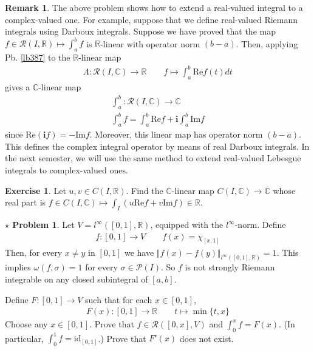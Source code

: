 \documentclass[12pt,b5paper,notitlepage]{article}
\theoremstyle{definition}
\newtheorem{exe}[df]{Exercise}
\newtheorem{rem}[df]{Remark}
\newtheorem{sprob}[prob]{\color{red}$\star$ Problem}
\theoremstyle{plain}
\newcommand{\mc}{\mathcal}
\newcommand{\id}{\mathrm{id}}
\newcommand{\scr}{\mathscr}
\newcommand{\im}{\mathbf{i}}
\newcommand{\Cbb}{\mathbb C}
\newcommand{\Rbb}{\mathbb R}
\newcommand{\Real}{\mathrm{Re}}
\newcommand{\Imag}{\mathrm{Im}}
\numberwithin{equation}{section}
\begin{document}
\begin{rem}
The above problem shows how to extend a real-valued integral to a complex-valued one. For example, suppose that we define real-valued Riemann integrals using Darboux integrals. Suppose we have proved that the map $f\in\scr R(I,\Rbb)\mapsto\int_a^b f$ is $\Rbb$-linear with operator norm $(b-a)$. Then, applying Pb. \ref{lb387} to the $\Rbb$-linear map
\begin{align*}
\Lambda:\scr R(I,\Cbb)\rightarrow \Rbb\qquad f\mapsto \int_a^b \Real f(t)dt
\end{align*}
gives a $\Cbb$-linear map
\begin{gather*}
\int_a^b:\scr R(I,\Cbb)\rightarrow\Cbb\\
\int_a^b f=\int_a^b\Real f+\im\int_a^b\Imag f
\end{gather*}
since $\Real(\im f)=-\Imag f$. Moreover, this linear map has operator norm $(b-a)$. This defines the complex integral operator by means of real Darboux integrals. In the next semester, we will use the same method to extend real-valued Lebesgue integrals to complex-valued ones.
\end{rem}


\begin{exe}
Let $u,v\in C(I,\Rbb)$. Find the $\Cbb$-linear map $C(I,\Cbb)\rightarrow\Cbb$ whose real part is $f\in C(I,\Cbb)\mapsto \int_I(u\Real f+v\Imag f)\in\Rbb$. 
\end{exe}



\begin{sprob}\label{lb389}
Let $V=l^\infty([0,1],\Rbb)$, equipped with the $l^\infty$-norm. Define 
\begin{align*}
f:[0,1]\rightarrow V\qquad f(x)=\chi_{[x,1]}
\end{align*}
Then, for every $x\neq y$ in $[0,1]$ we have $\Vert f(x)-f(y)\Vert_{l^\infty([0,1],\Rbb)}=1$. This implies $\omega(f,\sigma)=1$ for every $\sigma\in\mc P(I)$. So $f$ is not strongly Riemann integrable on any closed subintegral of $[a,b]$. 

Define $F:[0,1]\rightarrow V$ such that for each $x\in [0,1]$,
\begin{align*}
F(x):[0,1]\rightarrow\Rbb\qquad t\mapsto\min\{t,x\}
\end{align*}
Choose any $x\in[0,1]$. Prove that $f\in\scr R([0,x],V)$ and $\int_0^xf=F(x)$. (In particular, $\int_0^1f=\id_{[0,1]}$.) Prove that $F'(x)$ does not exist.  \hfill\qedsymbol
\end{sprob}
\end{document}
